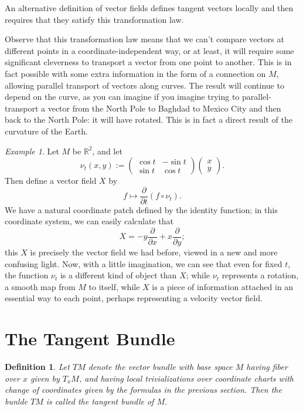 \documentclass[12pt]{article}
\newtheorem*{defn}{Definition}
\theoremstyle{remark}
\newtheorem*{example}{Example}
\begin{document}
An alternative definition of vector fields defines tangent vectors locally and then requires that they satisfy this transformation law.  

Observe that this transformation law means that we can't compare vectors at different points in a coordinate-independent way, or at least, it will require some significant cleverness to transport a vector from one point to another.  This is in fact possible with some extra information in the form of a connection on $M$, allowing parallel transport of vectors along curves.  The result will continue to depend on the curve, as you can imagine if you imagine trying to parallel-transport a vector from the North Pole to Baghdad to Mexico City and then back to the North Pole: it will have rotated.  This is in fact a direct result of the curvature of the Earth. 

\begin{example}
Let $M$ be $\mathbb{R}^2$, and let 
\[
\nu_t(x,y):=\begin{pmatrix}
\cos t & -\sin t \\
\sin t & \cos t
\end{pmatrix}\begin{pmatrix}
x \\
y
\end{pmatrix}.
\]
Then define a vector field $X$ by
\[
f \mapsto \frac{\partial}{\partial t}(f\circ\nu_t).
\]
We have a natural coordinate patch defined by the identity function; in this coordinate system, we can easily calculate that
\[
X = -y\frac{\partial}{\partial x} + x\frac{\partial}{\partial y};
\]
this $X$ is precisely the vector field we had before, viewed in a new and more confusing light.  Now, with a little imagination, we can see that even for fixed $t$, the function $\nu_t$ is a different kind of object than $X$; while $\nu_t$ represents a rotation, a smooth map from $M$ to itself, while $X$ is a piece of information attached in an essential way to each point, perhaps representing a velocity vector field. 
\end{example}

\section*{The Tangent Bundle}

\begin{defn}
Let $TM$ denote the vector bundle with base space $M$ having fiber over $x$ given by $T_xM$, and having local trivializations over coordinate charts with change of coordinates given by the formulas in the previous section.  Then the bunlde $TM$ is called the \emph{tangent bundle} of $M$.
\end{defn}
\end{document}
